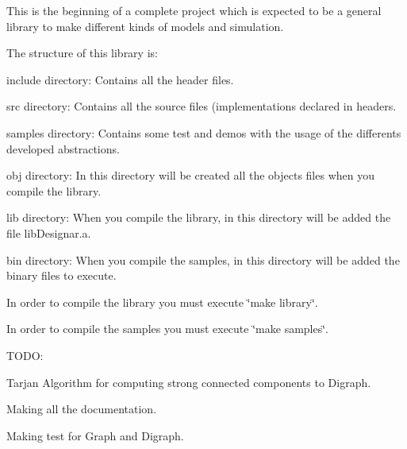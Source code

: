 This is the beginning of a complete project which is expected to be a general library to make different kinds of models and simulation.

The structure of this library is\+:


\begin{DoxyItemize}
\item include directory\+: Contains all the header files.
\item src directory\+: Contains all the source files (implementations declared in headers.
\item samples directory\+: Contains some test and demos with the usage of the differents developed abstractions.
\item obj directory\+: In this directory will be created all the objects files when you compile the library.
\item lib directory\+: When you compile the library, in this directory will be added the file lib\+Designar.\+a.
\item bin directory\+: When you compile the samples, in this directory will be added the binary files to execute.
\end{DoxyItemize}

In order to compile the library you must execute \char`\"{}make library\char`\"{}.

In order to compile the samples you must execute \char`\"{}make samples\char`\"{}.

T\+O\+DO\+:
\begin{DoxyItemize}
\item Tarjan Algorithm for computing strong connected components to Digraph.
\item Making all the documentation.
\item Making test for Graph and Digraph. 
\end{DoxyItemize}